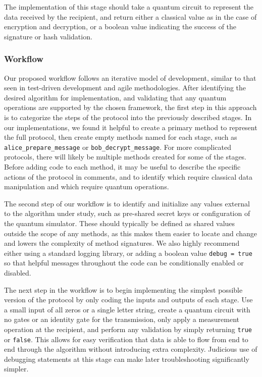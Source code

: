 \documentclass[sigconf]{acmart}
\begin{document}
The implementation of this stage should take a quantum circuit to represent the data received by the recipient, and return either a classical value as in the case of encryption and decryption, or a boolean value indicating the success of the signature or hash validation.

\subsubsection{Workflow}
Our proposed workflow follows an iterative model of development, similar to that seen in test-driven development and agile methodologies. After identifying the desired algorithm for implementation, and validating that any quantum operations are supported by the chosen framework, the first step in this approach is to categorize the steps of the protocol into the previously described stages. In our implementations, we found it helpful to create a primary method to represent the full protocol, then create empty methods named for each stage, such as \texttt{alice\_prepare\_message} or \texttt{bob\_decrypt\_message}. For more complicated protocols, there will likely be multiple methods created for some of the stages. Before adding code to each method, it may be useful to describe the specific actions of the protocol in comments, and to identify which require classical data manipulation and which require quantum operations.

The second step of our workflow is to identify and initialize any values external to the algorithm under study, such as pre-shared secret keys or configuration of the quantum simulator. These should typically be defined as shared values outside the scope of any methods, as this makes them easier to locate and change and lowers the complexity of method signatures. We also highly recommend either using a standard logging library, or adding a boolean value \texttt{debug = true} so that helpful messages throughout the code can be conditionally enabled or disabled.

The next step in the workflow is to begin implementing the simplest possible version of the protocol by only coding the inputs and outputs of each stage. Use a small input of all zeros or a single letter string, create a quantum circuit with no gates or an identity gate for the transmission, only apply a measurement operation at the recipient, and perform any validation by simply returning \texttt{true} or \texttt{false}. This allows for easy verification that data is able to flow from end to end through the algorithm without introducing extra complexity. Judicious use of debugging statements at this stage can make later troubleshooting significantly simpler.
\end{document}
